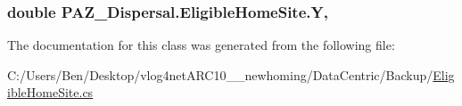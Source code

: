 \hypertarget{class_p_a_z___dispersal_1_1_eligible_home_site_a2f8047d8156fb5253c676b66b96f59b9}{
\subsubsection[{Y}]{\setlength{\rightskip}{0pt plus 5cm}double P\-A\-Z\-\_\-\-Dispersal.\-Eligible\-Home\-Site.\-Y\hspace{0.3cm}{\ttfamily [get]}, {\ttfamily [set]}}}\label{class_p_a_z___dispersal_1_1_eligible_home_site_a2f8047d8156fb5253c676b66b96f59b9}


The documentation for this class was generated from the following file\-:\begin{DoxyCompactItemize}
\item 
C\-:/\-Users/\-Ben/\-Desktop/vlog4net\-A\-R\-C10\-\_\-\_\-newhoming/\-Data\-Centric/\-Backup/\hyperlink{_backup_2_eligible_home_site_8cs}{Eligible\-Home\-Site.\-cs}\end{DoxyCompactItemize}
